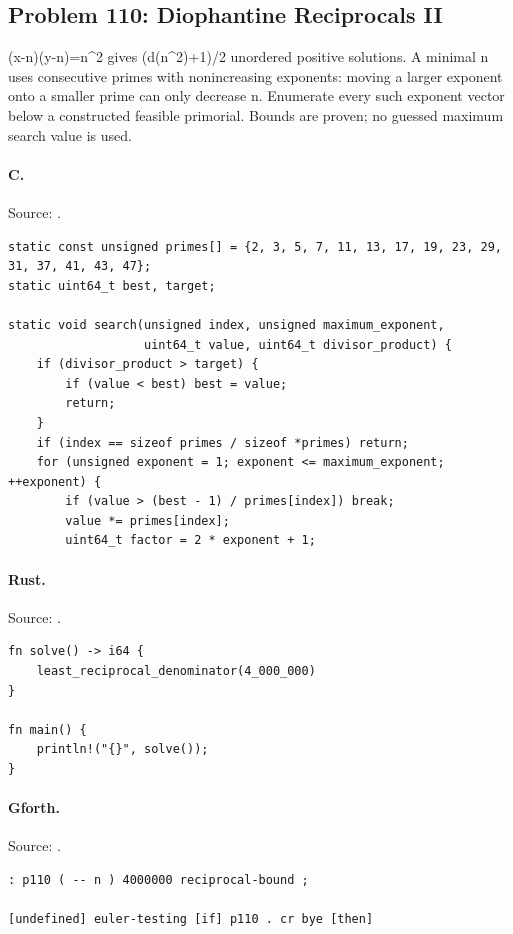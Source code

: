 \subsection{Problem 110: Diophantine Reciprocals II}
\label{walkthrough:p110}
(x-n)(y-n)=n\textasciicircum{}2 gives (d(n\textasciicircum{}2)+1)/2 unordered positive solutions. A minimal n uses consecutive primes with nonincreasing exponents: moving a larger exponent onto a smaller prime can only decrease n. Enumerate every such exponent vector below a constructed feasible primorial. Bounds are proven; no guessed maximum search value is used.

\paragraph{C.} Source: .
\begin{lstlisting}
static const unsigned primes[] = {2, 3, 5, 7, 11, 13, 17, 19, 23, 29, 31, 37, 41, 43, 47};
static uint64_t best, target;

static void search(unsigned index, unsigned maximum_exponent,
                   uint64_t value, uint64_t divisor_product) {
    if (divisor_product > target) {
        if (value < best) best = value;
        return;
    }
    if (index == sizeof primes / sizeof *primes) return;
    for (unsigned exponent = 1; exponent <= maximum_exponent; ++exponent) {
        if (value > (best - 1) / primes[index]) break;
        value *= primes[index];
        uint64_t factor = 2 * exponent + 1;
\end{lstlisting}

\paragraph{Rust.} Source: .
\begin{lstlisting}
fn solve() -> i64 {
    least_reciprocal_denominator(4_000_000)
}

fn main() {
    println!("{}", solve());
}
\end{lstlisting}

\paragraph{Gforth.} Source: .
\begin{lstlisting}
: p110 ( -- n ) 4000000 reciprocal-bound ;

[undefined] euler-testing [if] p110 . cr bye [then]
\end{lstlisting}

